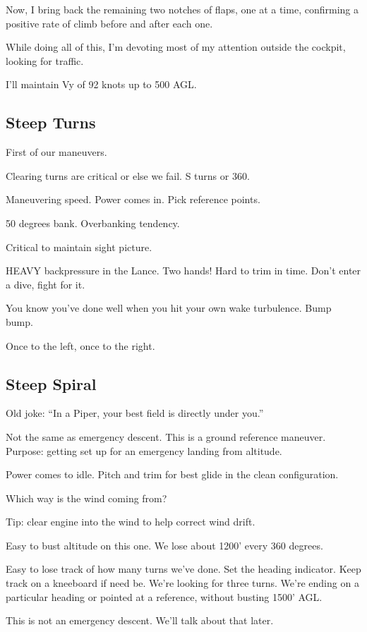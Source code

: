 Now, I bring back the remaining two notches of flaps, one at a time, confirming a positive rate of climb before and after each one.

While doing all of this, I'm devoting most of my attention outside the cockpit, looking for traffic.

I'll maintain Vy of 92 knots up to 500 AGL.

\subsection{Steep Turns}

First of our maneuvers.

Clearing turns are critical or else we fail. S turns or 360.

Maneuvering speed. Power comes in. Pick reference points.

50 degrees bank. Overbanking tendency.

Critical to maintain sight picture.

HEAVY backpressure in the Lance. Two hands! Hard to trim in time. Don't enter a dive, fight for it.

You know you've done well when you hit your own wake turbulence. Bump bump.

Once to the left, once to the right.

\subsection{Steep Spiral}

Old joke: ``In a Piper, your best field is directly under you.''

Not the same as emergency descent. This is a ground reference maneuver. Purpose: getting set up for an emergency landing from altitude.

Power comes to idle. Pitch and trim for best glide in the clean configuration.

Which way is the wind coming from?

Tip: clear engine into the wind to help correct wind drift.

Easy to bust altitude on this one. We lose about 1200' every 360 degrees.

Easy to lose track of how many turns we've done. Set the heading indicator. Keep track on a kneeboard if need be. We're looking for three turns. We're ending on a particular heading or pointed at a reference, without busting 1500' AGL.

This is not an emergency descent. We'll talk about that later.

